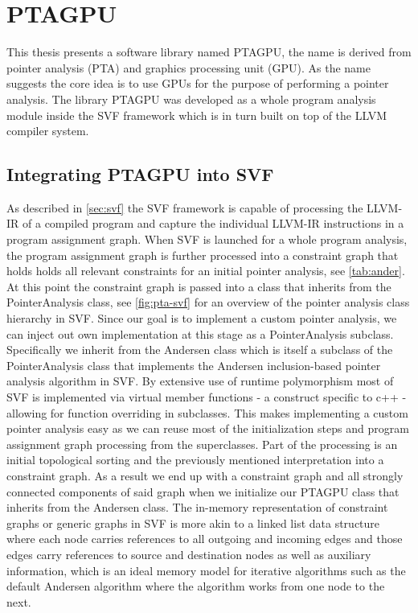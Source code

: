 \chapter{PTAGPU} \label{chap:main}
This thesis presents a software library named PTAGPU, the name is derived from pointer analysis (PTA) and graphics processing unit (GPU).
As the name suggests the core idea is to use GPUs for the purpose of performing a pointer analysis.
The library PTAGPU was developed as a whole program analysis module inside the SVF framework which is in turn built on top of the LLVM compiler system.
\section{Integrating PTAGPU into SVF}\label{sec:integsvf}
As described in \autoref{sec:svf} the SVF framework is capable of processing the LLVM-IR of a compiled program and capture the individual LLVM-IR instructions in a program assignment graph.
When SVF is launched for a whole program analysis, the program assignment graph is further processed into a constraint graph that holds holds all relevant constraints for an initial pointer analysis, see \autoref{tab:ander}.
At this point the constraint graph is passed into a class that inherits from the PointerAnalysis class, see \autoref{fig:pta-svf} for an overview of the pointer analysis class hierarchy in SVF.
Since our goal is to implement a custom pointer analysis, we can inject out own implementation at this stage as a PointerAnalysis subclass.
Specifically we inherit from the Andersen class which is itself a subclass of the PointerAnalysis class that implements the Andersen inclusion-based pointer analysis algorithm in SVF.
By extensive use of runtime polymorphism most of SVF is implemented via virtual member functions - a construct specific to c++ - allowing for function overriding in subclasses. This makes implementing a custom pointer analysis easy as we can reuse most of the initialization steps and program assignment graph processing from the superclasses. Part of the processing is an initial topological sorting and the previously mentioned interpretation into a constraint graph.
As a result we end up with a constraint graph and all strongly connected components of said graph when we initialize our PTAGPU class that inherits from the Andersen class.
The in-memory representation of constraint graphs or generic graphs in SVF is more akin to a linked list data structure where each node carries references to all outgoing and incoming edges and those edges carry references to source and destination nodes as well as auxiliary information, which is an ideal memory model for iterative algorithms such as the default Andersen algorithm where the algorithm works from one node to the next.
